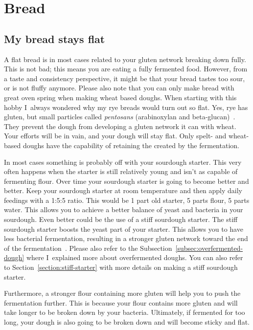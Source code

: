 \section{Bread}
\subsection{My bread stays flat}

A flat bread is in most cases related to your gluten
network breaking down fully. This is not bad; this
means you are eating a fully fermented food. However,
from a taste and consistency perspective, it might be
that your bread tastes too sour, or is not fluffy anymore.
Please also note that you can only make bread with
great oven spring when making wheat based doughs. When
starting with this hobby I~always wondered why my rye
breads would turn out so flat. Yes, rye has gluten, but
small particles called \emph{pentosans} (arabinoxylan and beta-glucan)~\cite{rye-defects}.
They prevent the dough from developing a gluten network it can
with wheat. Your efforts will be in vain, and your dough will
stay flat. Only spelt- and wheat-based doughs have the capability
of retaining the  created by the fermentation.

In most cases something is probably off with your
sourdough starter. This very often happens when the starter
is still relatively young and isn't as capable of
fermenting flour. Over time your sourdough
starter is going to become better and better.
Keep your sourdough starter at room temperature
and then apply daily feedings with a 1:5:5 ratio.
This would be 1 part old starter, 5 parts flour,
5 parts water. This allows you to achieve a better
balance of yeast and bacteria in your sourdough.
Even better could be the use of a stiff sourdough
starter. The stiff sourdough starter boosts
the yeast part of your starter. This allows you
to have less bacterial fermentation, resulting
in a stronger gluten network toward the end
of the fermentation~\cite{stiff+starter}. Please
also refer to the Subsection~\ref{subsec:overfermented-dough} where
I~explained more about overfermented doughs. You can also
refer to Section~\ref{section:stiff-starter} with more details on
making a stiff sourdough starter.

Furthermore, a stronger flour containing more gluten
will help you to push the fermentation further. This
is because your flour contains more gluten and will
take longer to be broken down by your bacteria. Ultimately,
if fermented for too long, your dough is also going
to be broken down and will become sticky and flat.

